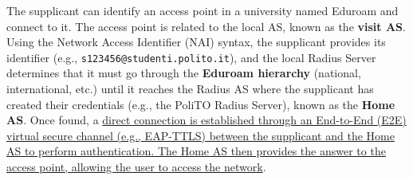 The supplicant can identify an access point in a university named Eduroam and connect to it. The access point is related to the local AS, known as the \textbf{visit AS}. Using the Network Access Identifier (NAI) syntax, the supplicant provides its identifier (e.g., \texttt{s123456@studenti.polito.it}), and the local Radius Server determines that it must go through the \textbf{Eduroam hierarchy} (national, international, etc.) until it reaches the Radius AS where the supplicant has created their credentials (e.g., the PoliTO Radius Server), known as the \textbf{Home AS}. Once found, a \ul{direct connection is established through an End-to-End (E2E) virtual secure channel (e.g., EAP-TTLS) between the supplicant and the Home AS to perform authentication. The Home AS then provides the answer to the access point, allowing the user to access the network}.
